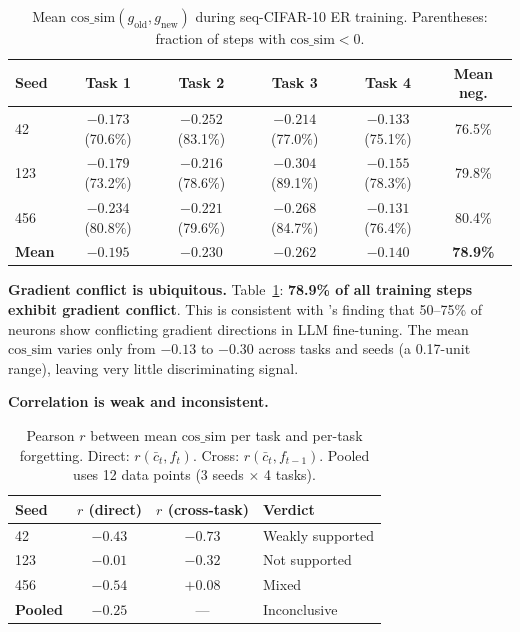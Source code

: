 \documentclass[11pt,a4paper]{article}
\newcommand{\toprule}{\hline\hline}
\newcommand{\midrule}{\hline}
\newcommand{\bottomrule}{\hline\hline}
\newcommand{\cossim}{\mathrm{cos\_sim}}
\begin{document}
\begin{table}[t]
\centering
\caption{Mean $\cossim(g_\mathrm{old}, g_\mathrm{new})$ during seq-CIFAR-10 ER training.
Parentheses: fraction of steps with $\cossim < 0$.}
\label{tab:h8_cossim}
\begin{tabular}{|l|c|c|c|c|c|}
\toprule
Seed & Task 1 & Task 2 & Task 3 & Task 4 & Mean neg. \\
\midrule
42  & $-0.173$ (70.6\%) & $-0.252$ (83.1\%) & $-0.214$ (77.0\%) & $-0.133$ (75.1\%) & 76.5\% \\
123 & $-0.179$ (73.2\%) & $-0.216$ (78.6\%) & $-0.304$ (89.1\%) & $-0.155$ (78.3\%) & 79.8\% \\
456 & $-0.234$ (80.8\%) & $-0.221$ (79.6\%) & $-0.268$ (84.7\%) & $-0.131$ (76.4\%) & 80.4\% \\
\midrule
\textbf{Mean} & $-0.195$ & $-0.230$ & $-0.262$ & $-0.140$ & \textbf{78.9\%} \\
\bottomrule
\end{tabular}
\end{table}

\textbf{Gradient conflict is ubiquitous.}
Table~\ref{tab:h8_cossim}: \textbf{78.9\% of all training steps exhibit gradient conflict}.
This is consistent with \citet{liu2026gradconflict}'s finding that 50--75\% of neurons
show conflicting gradient directions in LLM fine-tuning.
The mean $\cossim$ varies only from $-0.13$ to $-0.30$ across tasks and seeds
(a 0.17-unit range), leaving very little discriminating signal.

\textbf{Correlation is weak and inconsistent.}

\begin{table}[h]
\centering
\caption{Pearson $r$ between mean $\cossim$ per task and per-task forgetting.
Direct: $r(\bar{c}_t, f_t)$. Cross: $r(\bar{c}_t, f_{t-1})$.
Pooled uses 12 data points (3 seeds $\times$ 4 tasks).}
\label{tab:h8_corr}
\begin{tabular}{|l|c|c|l|}
\toprule
Seed & $r$ (direct) & $r$ (cross-task) & Verdict \\
\midrule
42  & $-0.43$ & $-0.73$ & Weakly supported \\
123 & $-0.01$ & $-0.32$ & Not supported    \\
456 & $-0.54$ & $+0.08$ & Mixed            \\
\midrule
\textbf{Pooled} & $\mathbf{-0.25}$ & --- & Inconclusive \\
\bottomrule
\end{tabular}
\end{table}
\end{document}
